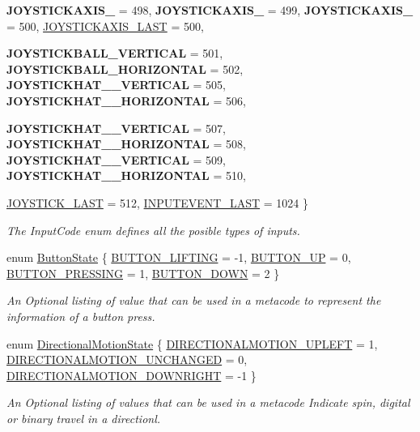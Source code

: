 \begin{DoxyCompactItemize}
\par
{\bfseries JOYSTICKAXIS\_} =  498, 
{\bfseries JOYSTICKAXIS\_} =  499, 
{\bfseries JOYSTICKAXIS\_} =  500, 
\hyperlink{classphys_1_1MetaCode_a3e501cbb5bf0f6f1fdb7211465bda8d8a8429dc92596989463fabd62deed05fae}{JOYSTICKAXIS\_\-LAST} =  500, 
\par
{\bfseries JOYSTICKBALL\_\-VERTICAL} =  501, 
{\bfseries JOYSTICKBALL\_\-HORIZONTAL} =  502, 
{\bfseries JOYSTICKHAT\_\_\-VERTICAL} =  505, 
{\bfseries JOYSTICKHAT\_\_\-HORIZONTAL} =  506, 
\par
{\bfseries JOYSTICKHAT\_\_\-VERTICAL} =  507, 
{\bfseries JOYSTICKHAT\_\_\-HORIZONTAL} =  508, 
{\bfseries JOYSTICKHAT\_\_\-VERTICAL} =  509, 
{\bfseries JOYSTICKHAT\_\_\-HORIZONTAL} =  510, 
\par
\hyperlink{classphys_1_1MetaCode_a3e501cbb5bf0f6f1fdb7211465bda8d8afa71c1a74177cf69c80c08a010b97dff}{JOYSTICK\_\-LAST} =  512, 
\hyperlink{classphys_1_1MetaCode_a3e501cbb5bf0f6f1fdb7211465bda8d8adc78bfd04a85c4bbe39718f9acacbbe3}{INPUTEVENT\_\-LAST} =  1024
 \}
\begin{DoxyCompactList}\small\item\em The InputCode enum defines all the posible types of inputs. \item\end{DoxyCompactList}\item 
enum \hyperlink{classphys_1_1MetaCode_a2fdfb26b3e50ceb0ccc60bfc4c3d6ac2}{ButtonState} \{ \hyperlink{classphys_1_1MetaCode_a2fdfb26b3e50ceb0ccc60bfc4c3d6ac2a6b5564408703517f36debd8c423e2dee}{BUTTON\_\-LIFTING} =  -\/1, 
\hyperlink{classphys_1_1MetaCode_a2fdfb26b3e50ceb0ccc60bfc4c3d6ac2ae275c52779b0f6ec37533af256a70cc3}{BUTTON\_\-UP} =  0, 
\hyperlink{classphys_1_1MetaCode_a2fdfb26b3e50ceb0ccc60bfc4c3d6ac2a33669b2b9ca814664296da55702e412d}{BUTTON\_\-PRESSING} =  1, 
\hyperlink{classphys_1_1MetaCode_a2fdfb26b3e50ceb0ccc60bfc4c3d6ac2a5b52ee1db94dbc2db23f3b4c267b5438}{BUTTON\_\-DOWN} =  2
 \}
\begin{DoxyCompactList}\small\item\em An Optional listing of value that can be used in a metacode to represent the information of a button press. \item\end{DoxyCompactList}\item 
enum \hyperlink{classphys_1_1MetaCode_ad6ed6266b5f4219a6f5da29ebe018757}{DirectionalMotionState} \{ \hyperlink{classphys_1_1MetaCode_ad6ed6266b5f4219a6f5da29ebe018757ae4b09c3b8e79b189d9fbc2ea8a1bcade}{DIRECTIONALMOTION\_\-UPLEFT} =  1, 
\hyperlink{classphys_1_1MetaCode_ad6ed6266b5f4219a6f5da29ebe018757a01bfdb29aaa2cb816b704667d5cc348f}{DIRECTIONALMOTION\_\-UNCHANGED} =  0, 
\hyperlink{classphys_1_1MetaCode_ad6ed6266b5f4219a6f5da29ebe018757af4a101f9bcd1baedca43bacd3845eb41}{DIRECTIONALMOTION\_\-DOWNRIGHT} =  -\/1
 \}
\begin{DoxyCompactList}\small\item\em An Optional listing of values that can be used in a metacode Indicate spin, digital or binary travel in a directionl. \item\end{DoxyCompactList}\end{DoxyCompactItemize}
